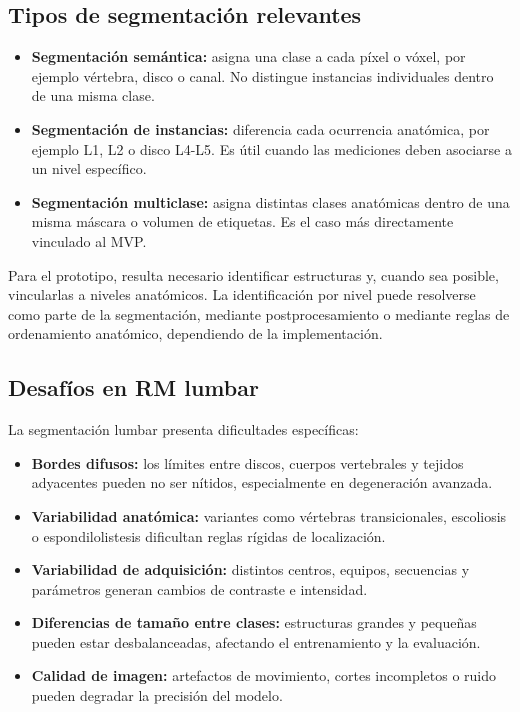 \subsection{Tipos de segmentación relevantes}

\begin{itemize}
    \item \textbf{Segmentación semántica:} asigna una clase a cada píxel o vóxel, por ejemplo vértebra, disco o canal. No distingue instancias individuales dentro de una misma clase.
    \item \textbf{Segmentación de instancias:} diferencia cada ocurrencia anatómica, por ejemplo L1, L2 o disco L4-L5. Es útil cuando las mediciones deben asociarse a un nivel específico.
    \item \textbf{Segmentación multiclase:} asigna distintas clases anatómicas dentro de una misma máscara o volumen de etiquetas. Es el caso más directamente vinculado al MVP.
\end{itemize}

Para el prototipo, resulta necesario identificar estructuras y, cuando sea posible, vincularlas a niveles anatómicos. La identificación por nivel puede resolverse como parte de la segmentación, mediante postprocesamiento o mediante reglas de ordenamiento anatómico, dependiendo de la implementación.

\subsection{Desafíos en RM lumbar}

La segmentación lumbar presenta dificultades específicas:

\begin{itemize}
    \item \textbf{Bordes difusos:} los límites entre discos, cuerpos vertebrales y tejidos adyacentes pueden no ser nítidos, especialmente en degeneración avanzada.
    \item \textbf{Variabilidad anatómica:} variantes como vértebras transicionales, escoliosis o espondilolistesis dificultan reglas rígidas de localización.
    \item \textbf{Variabilidad de adquisición:} distintos centros, equipos, secuencias y parámetros generan cambios de contraste e intensidad.
    \item \textbf{Diferencias de tamaño entre clases:} estructuras grandes y pequeñas pueden estar desbalanceadas, afectando el entrenamiento y la evaluación.
    \item \textbf{Calidad de imagen:} artefactos de movimiento, cortes incompletos o ruido pueden degradar la precisión del modelo.
\end{itemize}


